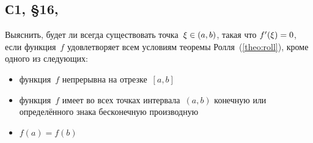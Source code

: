 \documentclass[a4paper,12pt]{article}
\begin{document}
  \subsection{С1, \S 16, }

  Выяснить, будет ли всегда существовать точка~$\xi \hm\in (a, b)$, такая что $f'(\xi) \hm= 0$, если функция~$f$ удовлетворяет всем условиям теоремы Ролля~(\ref{theo:roll}), кроме одного из следующих:
  \begin{itemize}
    \item функция~$f$ непрерывна на отрезке~$[a, b]$
    \item функция~$f$ имеет во всех точках интервала~$(a, b)$ конечную или определённого знака бесконечную производную
    \item $f(a) = f(b)$
  \end{itemize}
  
\end{document}
